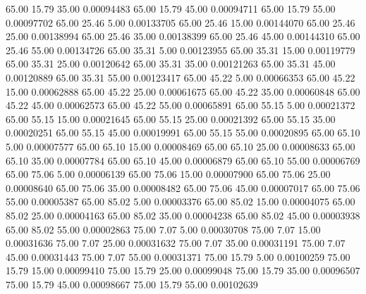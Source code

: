      65.00     15.79     35.00     0.00094483
     65.00     15.79     45.00     0.00094711
     65.00     15.79     55.00     0.00097702
     65.00     25.46      5.00     0.00133705
     65.00     25.46     15.00     0.00144070
     65.00     25.46     25.00     0.00138994
     65.00     25.46     35.00     0.00138399
     65.00     25.46     45.00     0.00144310
     65.00     25.46     55.00     0.00134726
     65.00     35.31      5.00     0.00123955
     65.00     35.31     15.00     0.00119779
     65.00     35.31     25.00     0.00120642
     65.00     35.31     35.00     0.00121263
     65.00     35.31     45.00     0.00120889
     65.00     35.31     55.00     0.00123417
     65.00     45.22      5.00     0.00066353
     65.00     45.22     15.00     0.00062888
     65.00     45.22     25.00     0.00061675
     65.00     45.22     35.00     0.00060848
     65.00     45.22     45.00     0.00062573
     65.00     45.22     55.00     0.00065891
     65.00     55.15      5.00     0.00021372
     65.00     55.15     15.00     0.00021645
     65.00     55.15     25.00     0.00021392
     65.00     55.15     35.00     0.00020251
     65.00     55.15     45.00     0.00019991
     65.00     55.15     55.00     0.00020895
     65.00     65.10      5.00     0.00007577
     65.00     65.10     15.00     0.00008469
     65.00     65.10     25.00     0.00008633
     65.00     65.10     35.00     0.00007784
     65.00     65.10     45.00     0.00006879
     65.00     65.10     55.00     0.00006769
     65.00     75.06      5.00     0.00006139
     65.00     75.06     15.00     0.00007900
     65.00     75.06     25.00     0.00008640
     65.00     75.06     35.00     0.00008482
     65.00     75.06     45.00     0.00007017
     65.00     75.06     55.00     0.00005387
     65.00     85.02      5.00     0.00003376
     65.00     85.02     15.00     0.00004075
     65.00     85.02     25.00     0.00004163
     65.00     85.02     35.00     0.00004238
     65.00     85.02     45.00     0.00003938
     65.00     85.02     55.00     0.00002863
     75.00      7.07      5.00     0.00030708
     75.00      7.07     15.00     0.00031636
     75.00      7.07     25.00     0.00031632
     75.00      7.07     35.00     0.00031191
     75.00      7.07     45.00     0.00031443
     75.00      7.07     55.00     0.00031371
     75.00     15.79      5.00     0.00100259
     75.00     15.79     15.00     0.00099410
     75.00     15.79     25.00     0.00099048
     75.00     15.79     35.00     0.00096507
     75.00     15.79     45.00     0.00098667
     75.00     15.79     55.00     0.00102639
